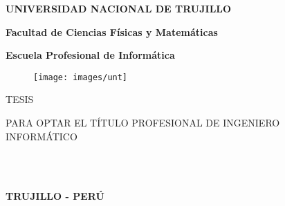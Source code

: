 

\textheight 19cm
\pagestyle{empty}
\begin{center}
 {\bf {\fontsize{14}{16.8}\selectfont UNIVERSIDAD NACIONAL DE TRUJILLO}}     
 
    {\bf{\fontsize{14}{16.8}\selectfont Facultad de Ciencias Físicas y Matemáticas}} 

  {\bf{\fontsize{14}{16.8}\selectfont Escuela Profesional de Informática}}
\end{center}  

\begin{figure}[ht]
\begin{center}
\texttt{[image: images/unt]}
\end{center}
\end{figure}
\vskip 0.5cm

\begin{center}
  {\bf\Large{{\fontsize{17}{20.4}\selectfont{\titleTesis} }}}     
\end{center}
\vskip 0.5cm

\begin{center}
{\Large{TESIS}}
\end{center}
\begin{center}
{\large{\hspace*{0.4cm} PARA OPTAR EL TÍTULO PROFESIONAL DE INGENIERO  INFORMÁTICO}}
\end{center}

\vskip 0.6cm
\begin{center}
  { \fontsize{14}{16.8}} \\
    { \fontsize{14}{16.8}\selectfont {\hspace{-0.4cm} \authorTwo}}\\
    \vskip 0.2cm
    { \fontsize{14}{16.8}}

     
\end{center}   


\vskip 1.1cm
\begin{center}    
{\bf {\fontsize{14}{16.8}\selectfont TRUJILLO - PERÚ
\vskip 0.0cm
\hspace*{-0.2cm} 
\yearTesis }}
\end{center} 
\newpage


